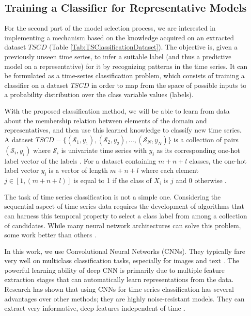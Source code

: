 \subsection{Training a Classifier for Representative Models}
\label{Sec:TrainingClassifier}

For the second part of the model selection process, we are interested in implementing a mechanism based on the knowledge acquired on an extracted dataset $TSCD$ (Table \ref{Tab:TSClassificationDataset}). The objective is, given a previously unseen time series, to infer a suitable label (and thus a predictive model on a representative) for it by recognizing patterns in the time series. It can be formulated as a time-series classification problem, which consists of training a classifier on a dataset $TSCD$ in order to map from the space of possible inputs to a probability distribution over the class variable values (labels).  

With the proposed classification method, we will be able to learn from data about the membership relation between elements of the domain and representatives, and then use this learned knowledge to classify new time series. A dataset $TSCD=\{(\mathcal{S}_1,y_1),(\mathcal{S}_2,y_2), \ldots ,(\mathcal{S}_N,y_N)\}$ is a collection of pairs $(\mathcal{S}_i,y_i)$ where $\mathcal{S}_i$ is univariate time series with $y_i$ as its corresponding one-hot label vector of the labels \cite{Gulli2017}. For a dataset containing $m+n+l$ classes, the one-hot label vector $y_i$ is a vector of length $m+n+l$ where each element $j \in [1,(m+n+l)]$ is equal to 1 if the class of $X_i$ is $j$ and $0$ otherwise \cite{Mitsa2010}.

The task of time series classification is not a simple one. Considering the sequential aspect of time series data requires the development of algorithms that can harness this temporal property to select a class label from among a collection of candidates. While many neural network architectures can solve this problem, some work better than others \cite{Bagnall2017a}.

In this work, we use Convolutional Neural Networks (CNNs). They typically fare very well on multiclass classification tasks, especially for images and text \cite{Goodfellow2016}. The powerful learning ability of deep CNN is primarily due to multiple feature extraction stages that can automatically learn representations from the data. Research has shown that using CNNs for time series classification has several advantages over other methods; they are highly noise-resistant models. They can extract very informative, deep features independent of time \cite{Wang2016, Bagnall2017a, Zhao2017}.


